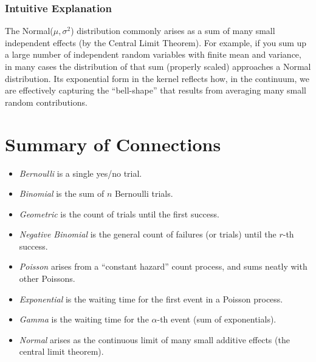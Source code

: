 \documentclass{article}
\begin{document}
\subsubsection*{Intuitive Explanation}
The Normal(\(\mu,\sigma^2\)) distribution commonly arises as a sum of many small independent effects (by the Central Limit Theorem). 
For example, if you sum up a large number of independent random variables with finite mean and variance, in many cases the distribution of that sum (properly scaled) approaches a Normal distribution. 
Its exponential form in the kernel reflects how, in the continuum, we are effectively capturing the ``bell-shape'' that results from averaging many small random contributions.

\pagebreak
\section*{Summary of Connections}
\begin{itemize}
\item \emph{Bernoulli} is a single yes/no trial. 
\item \emph{Binomial} is the sum of \(n\) Bernoulli trials. 
\item \emph{Geometric} is the count of trials until the first success. 
\item \emph{Negative Binomial} is the general count of failures (or trials) until the \(r\)-th success. 
\item \emph{Poisson} arises from a ``constant hazard'' count process, and sums neatly with other Poissons. 
\item \emph{Exponential} is the waiting time for the first event in a Poisson process. 
\item \emph{Gamma} is the waiting time for the \(\alpha\)-th event (sum of exponentials). 
\item \emph{Normal} arises as the continuous limit of many small additive effects (the central limit theorem).
\end{itemize}
\end{document}
